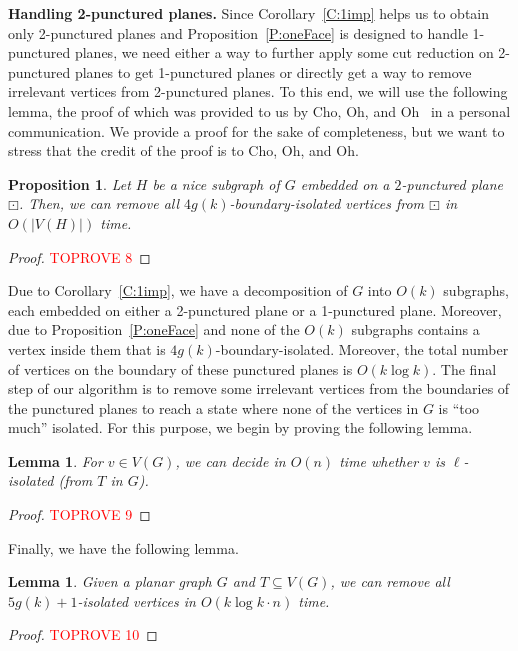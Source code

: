 \documentclass{article}
\newtheorem{lemma}[theorem]{Lemma}
\newtheorem{proposition}[theorem]{Proposition}
\numberwithin{claimcounter}{lemma}
\begin{document}
\medskip
\noindent\textbf{Handling 2-punctured planes.} Since Corollary~\ref{C:1imp} helps us to obtain only 2-punctured planes and Proposition~\ref{P:oneFace} is designed to handle 1-punctured planes, we need  either a way to further apply some cut reduction on 2-punctured planes to get 1-punctured planes or directly get a way to remove irrelevant vertices from 2-punctured planes. To this end, we will use the following lemma, the proof of which was provided to us by Cho, Oh, and Oh~\cite{cho2023parameterized} in a personal communication. We provide a proof for the sake of completeness, but we want to stress that the credit of the proof is to Cho, Oh, and Oh.
\begin{proposition}\label{L:2Cycle}
    Let $H$ be a nice subgraph of $G$ embedded on a $2$-punctured plane $\boxdot$. Then, we can remove all $4g(k)$-boundary-isolated vertices from $\boxdot$ in $O(|V(H)|)$ time.  
\end{proposition}
\begin{proof}\textcolor{red}{TOPROVE 8}\end{proof}

Due to Corollary~\ref{C:1imp}, we have a decomposition of $G$ into  $O(k)$ subgraphs, each embedded on either a 2-punctured plane or a 1-punctured plane. Moreover, due to Proposition~\ref{P:oneFace} and  none of the $O(k)$ subgraphs contains a vertex inside them that is $4g(k)$-boundary-isolated. Moreover, the total number of vertices on the boundary of these punctured planes is $O (k \log k)$. The final step of our algorithm is to remove some irrelevant vertices from the boundaries of the punctured planes to reach a state where none of the vertices in $G$ is ``too much'' isolated. For this purpose, we begin by proving the following lemma. 
\begin{lemma}\label{L:boundary}
    For $v\in V(G)$, we can decide in $O(n)$ time whether $v$ is $\ell$-isolated (from $T$ in $G$).
\end{lemma}
\begin{proof}\textcolor{red}{TOPROVE 9}\end{proof}

Finally, we have the following lemma.
\begin{lemma}\label{L:fin}
    Given a planar graph $G$ and $T\subseteq V(G)$, we can remove all $5g(k)+1$-isolated vertices in $O(k\log k \cdot n)$ time. 
\end{lemma}
\begin{proof}\textcolor{red}{TOPROVE 10}\end{proof}
\end{document}
